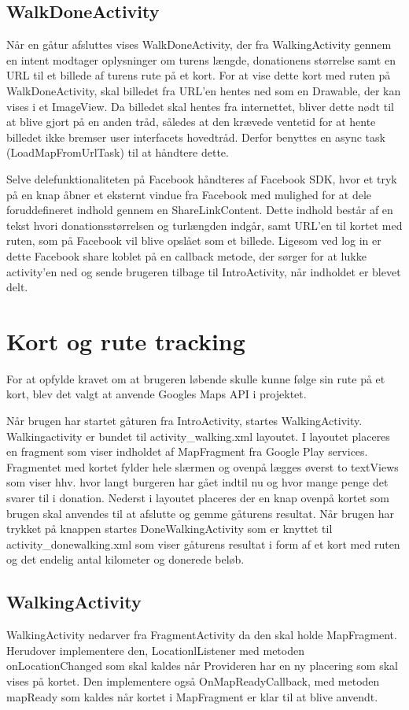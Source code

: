 \subsection{WalkDoneActivity}
Når en gåtur afsluttes vises WalkDoneActivity, der fra WalkingActivity gennem en intent modtager oplysninger om turens længde, donationens størrelse samt en URL til et billede af turens rute på et kort. For at vise dette kort med ruten på WalkDoneActivity, skal billedet fra URL’en hentes ned som en Drawable, der kan vises i et ImageView. Da billedet skal hentes fra internettet, bliver dette nødt til at blive gjort på en anden tråd, således at den krævede ventetid for at hente billedet ikke bremser user interfacets hovedtråd. Derfor benyttes en async task (LoadMapFromUrlTask) til at håndtere dette.

Selve delefunktionaliteten på Facebook håndteres af Facebook SDK, hvor et tryk på en knap åbner et eksternt vindue fra Facebook med mulighed for at dele foruddefineret indhold gennem en ShareLinkContent. Dette indhold består af en tekst hvori donationsstørrelsen og turlængden indgår, samt URL’en til kortet med ruten, som på Facebook vil blive opslået som et billede. Ligesom ved log in er dette Facebook share koblet på en callback metode, der sørger for at lukke activity’en ned og sende brugeren tilbage til IntroActivity, når indholdet er blevet delt.

\section{Kort og rute tracking}
For at opfylde kravet om at brugeren løbende skulle kunne følge sin rute på et kort, blev det valgt at anvende Googles Maps API i projektet.

Når brugen har startet gåturen fra IntroActivity, startes WalkingActivity. Walkingactivity er bundet til activity\_walking.xml layoutet. I layoutet placeres en fragment som viser indholdet af MapFragment fra Google Play services. Fragmentet med kortet fylder hele slærmen og ovenpå lægges øverst to textViews som viser hhv. hvor langt burgeren har gået indtil nu og hvor mange penge det svarer til i donation.
Nederst i layoutet placeres der en knap ovenpå kortet som brugen skal anvendes til at afslutte og gemme gåturens resultat. Når brugen har trykket på knappen startes DoneWalkingActivity som er knyttet til activity\_donewalking.xml som viser gåturens resultat i form af et kort med ruten og det endelig antal kilometer og donerede beløb.

\subsection{WalkingActivity}
WalkingActivity nedarver fra FragmentActivity da den skal holde MapFragment. Herudover implementere den, LocationlListener med metoden onLocationChanged som skal kaldes når Provideren har en ny placering som skal vises på kortet. Den implementere også OnMapReadyCallback, med metoden mapReady som kaldes når kortet i MapFragment er klar til at blive anvendt.

